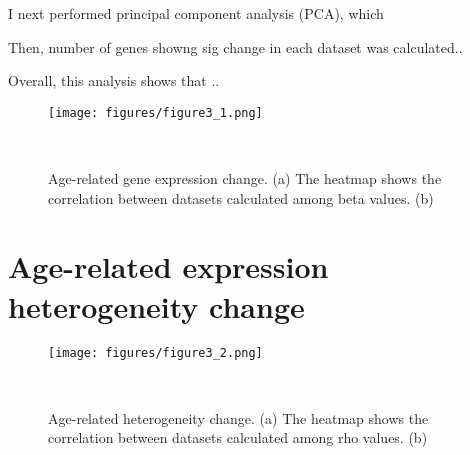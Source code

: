I next performed principal component analysis (PCA), which

Then, number of genes showng sig change in each dataset was calculated..

Overall, this analysis shows that ..


\begin{figure}[h]
    \centering
    \texttt{[image: figures/figure3\_1.png]}
    \caption{Age-related gene expression change. 
    (a) The heatmap shows the correlation between datasets calculated among beta values.
    (b) 
    }~\label{fig:fig3.1}
\end{figure}

\section{Age-related expression heterogeneity change}

\begin{figure}[h]
    \centering
    \texttt{[image: figures/figure3\_2.png]}
    \caption{Age-related heterogeneity change. 
    (a) The heatmap shows the correlation between datasets calculated among rho values.
    (b) 
    }~\label{fig:fig3.2}
\end{figure}

